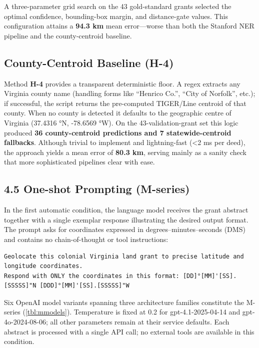 A three-parameter grid search on the 43 gold-standard grants selected
the optimal confidence, bounding-box margin, and distance-gate values.
This configuration attains a \textbf{94.3 km} mean error---worse than
both the Stanford NER pipeline and the county-centroid baseline.

\subsection{County-Centroid Baseline
(H-4)}\label{county-centroid-baseline-h-4}

Method \textbf{H-4} provides a transparent deterministic floor. A regex
extracts any Virginia county name (handling forms like ``Henrico Co.'',
``City of Norfolk'', etc.); if successful, the script returns the
pre-computed TIGER/Line centroid of that county. When no county is
detected it defaults to the geographic centre of Virginia (37.4316 °N,
-78.6569 °W). On the 43-validation-grant set this logic produced
\textbf{36 county-centroid predictions and 7 statewide-centroid
fallbacks}. Although trivial to implement and lightning-fast (\textless2
ms per deed), the approach yields a mean error of \textbf{80.3 km},
serving mainly as a sanity check that more sophisticated pipelines clear
with ease.

\subsection{4.5 One-shot Prompting
(M-series)}\label{one-shot-prompting-m-series}

In the first automatic condition, the language model receives the grant
abstract together with a single exemplar response illustrating the
desired output format. The prompt asks for coordinates expressed in
degrees--minutes--seconds (DMS) and contains no chain-of-thought or tool
instructions:

\begin{lstlisting}
Geolocate this colonial Virginia land grant to precise latitude and longitude coordinates.
Respond with ONLY the coordinates in this format: [DD]°[MM]'[SS].[SSSSS]"N [DDD]°[MM]'[SS].[SSSSS]"W
\end{lstlisting}

Six OpenAI model variants spanning three architecture families
constitute the M-series (\ref{tbl:mmodels}). Temperature is fixed at 0.2
for gpt-4.1-2025-04-14 and gpt-4o-2024-08-06; all other parameters
remain at their service defaults. Each abstract is processed with a
single API call; no external tools are available in this condition.

